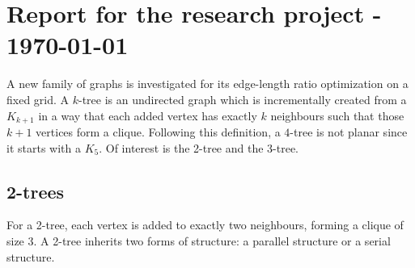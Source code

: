 \section{Report for the research project - \today}
A new family of graphs is investigated for its edge-length ratio optimization on a fixed grid. A $k$-tree is an undirected graph which is incrementally created from a $K_{k+1}$ in a way that each added vertex has exactly $k$ neighbours such that those $k+1$ vertices form a clique. Following this definition, a $4$-tree is not planar since it starts with a $K_5$. Of interest is the 2-tree and the 3-tree. 
\subsection{2-trees}
For a 2-tree, each vertex is added to exactly two neighbours, forming a clique of size 3. A 2-tree inherits two forms of structure: a parallel structure or a serial structure.
